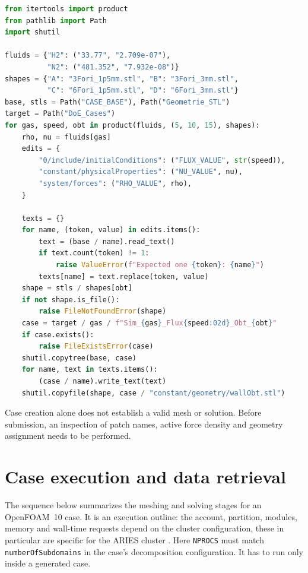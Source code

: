 \begin{lstlisting}[language=Python,numbers=none,basicstyle=\ttfamily\footnotesize,caption={DoE case generation with explicit template checks.}]
from itertools import product
from pathlib import Path
import shutil

fluids = {"H2": ("33.77", "2.709e-07"),
          "N2": ("481.352", "7.932e-08")}
shapes = {"A": "3Fori_1p5mm.stl", "B": "3Fori_3mm.stl",
          "C": "6Fori_1p5mm.stl", "D": "6Fori_3mm.stl"}
base, stls = Path("CASE_BASE"), Path("Geometrie_STL")
target = Path("DoE_Cases")
for gas, speed, obt in product(fluids, (5, 10, 15), shapes):
    rho, nu = fluids[gas]
    edits = {
        "0/include/initialConditions": ("FLUX_VALUE", str(speed)),
        "constant/physicalProperties": ("NU_VALUE", nu),
        "system/forces": ("RHO_VALUE", rho),
    }
    
    texts = {}
    for name, (token, value) in edits.items():
        text = (base / name).read_text()
        if text.count(token) != 1:
            raise ValueError(f"Expected one {token}: {name}")
        texts[name] = text.replace(token, value)
    shape = stls / shapes[obt]
    if not shape.is_file():
        raise FileNotFoundError(shape)
    case = target / gas / f"Sim_{gas}_Flux{speed:02d}_Obt_{obt}"
    if case.exists():
        raise FileExistsError(case)
    shutil.copytree(base, case)
    for name, text in texts.items():
        (case / name).write_text(text)
    shutil.copyfile(shape, case / "constant/geometry/wallObt.stl")
\end{lstlisting}

Case creation alone does not establish a valid mesh or solution. Before submission, an inspection of patch names, active force density and geometry assignment needs to be performed.

\clearpage
\section{Case execution and data retrieval}
\label{sec:app_slurm_scripts}

The sequence below summarizes the meshing and solving stages for an OpenFOAM~10 case. It is an execution outline: the account, partition, modules, memory and wall-time requests depend on the cluster configuration, these in particular are specific for the ARIES cluster \cite{hpc_aries}. Here \texttt{NPROCS} must match \texttt{numberOfSubdomains} in the case's decomposition configuration. It has to run only inside a generated case.

